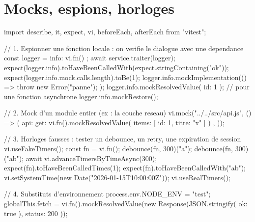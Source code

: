 \documentclass[12pt,a4paper,twoside,openright]{book}
\begin{document}

\section{Mocks, espions, horloges}

\begin{codejs}
import { describe, it, expect, vi, beforeEach, afterEach } from "vitest";

// 1. Espionner une fonction locale : on verifie le dialogue avec une dependance
const logger = { info: vi.fn() };
await service.traiter(logger);
expect(logger.info).toHaveBeenCalledWith(expect.stringContaining("ok"));
expect(logger.info.mock.calls.length).toBe(1);
logger.info.mockImplementation(() => { throw new Error("panne"); });
logger.info.mockResolvedValue({ id: 1 });       // pour une fonction asynchrone
logger.info.mockRestore();

// 2. Mock d'un module entier (ex : la couche reseau)
vi.mock("../../src/api.js", () => ({
  api: { get: vi.fn().mockResolvedValue({ items: [{ id: 1, titre: "x" }] }) },
}));

// 3. Horloges fausses : tester un debounce, un retry, une expiration de session
vi.useFakeTimers();
const fn = vi.fn();
debounce(fn, 300)("a"); debounce(fn, 300)("ab");
await vi.advanceTimersByTimeAsync(300);
expect(fn).toHaveBeenCalledTimes(1);
expect(fn).toHaveBeenCalledWith("ab");
vi.setSystemTime(new Date("2026-01-15T10:00:00Z"));
vi.useRealTimers();

// 4. Substituts d'environnement
process.env.NODE_ENV = "test";
globalThis.fetch = vi.fn().mockResolvedValue(new Response(JSON.stringify({ ok: true }), { status: 200 }));
\end{codejs}
\end{document}
